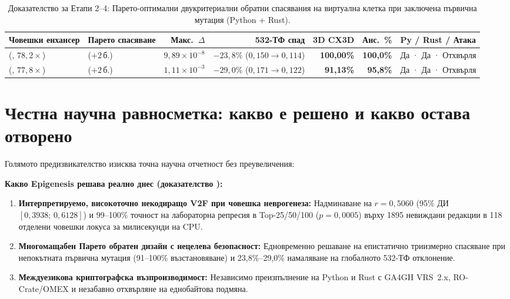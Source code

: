 \documentclass[10.5pt,a4paper]{article}
\begin{document}
\begin{table}[tb]
\scriptsize\setlength{\tabcolsep}{4pt}
\caption{Доказателство за Етапи 2--4: Парето-оптимални двукритериални обратни спасявания на виртуална клетка при заключена първична мутация (Python + Rust).}\label{tab:pareto}
\begin{tabular}{@{}L{30mm}L{19mm}r r r r L{21mm}@{}}
\toprule
Човешки енхансер & Парето спасяване & Макс.\ $\Delta$ & 532-ТФ спад & 3D CX3D & Анс.\ \% & Py / Rust / Атака \\
\midrule
{} (, $78{,}2\times$) & \textbf{} ($+2$\,б.) & \textbf{$9{,}89\times10^{-8}$} & \textbf{$-23{,}8\%$} ($0{,}150\to 0{,}114$) & \textbf{100,00\%} & \textbf{100,0\%} & Да · Да · Отхвърля \\
 (, $77{,}8\times$) & \textbf{} ($+2$\,б.) & $1{,}11\times10^{-3}$ & \textbf{$-29{,}0\%$} ($0{,}171\to 0{,}122$) & \textbf{91,13\%} & \textbf{95,8\%} & Да · Да · Отхвърля \\
\bottomrule
\end{tabular}
\end{table}

\section{Честна научна равносметка: какво е решено и какво остава отворено}

Голямото предизвикателство изисква точна научна отчетност без преувеличения:

\textbf{Какво Epigenesis решава реално днес (доказателство ):}
\begin{enumerate}
\item \textbf{Интерпретируемо, високоточно некодиращо V2F при човешка неврогенеза:} Надминаване на $r=0{,}5060$ (95\% ДИ $[0{,}3938;\, 0{,}6128]$) и 99--100\% точност на лабораторна репресия в Top-25/50/100 ($p=0{,}0005$) върху 1895 невиждани редакции в 118 отделени човешки локуса за милисекунди на CPU.
\item \textbf{Многомащабен Парето обратен дизайн с нецелева безопасност:} Едновременно решаване на епистатично триизмерно спасяване при непокътната първична мутация (91--100\% възстановяване) и 23,8\%--29,0\% намаляване на глобалното 532-ТФ отклонение.
\item \textbf{Междуезикова криптографска възпроизводимост:} Независимо преизпълнение на Python и Rust с GA4GH VRS~2.x, RO-Crate/OMEX и незабавно отхвърляне на еднобайтова подмяна.
\end{enumerate}
\end{document}
